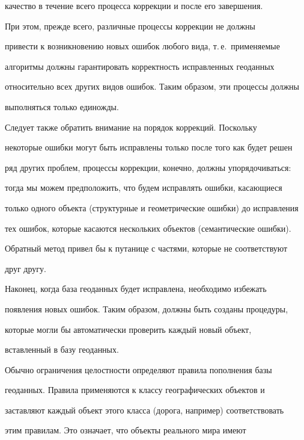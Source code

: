 качество в течение всего процесса коррекции и после его завершения. 


    


    При этом, прежде всего, различные процессы коррекции не должны 


привести к возникновению новых ошибок любого вида, т.\,е.\ применяемые 


алгоритмы должны гарантировать корректность исправленных геоданных 


относительно всех других видов ошибок. Таким образом, эти процессы должны 


выполняться только единожды. 


    


    Следует также обратить внимание на порядок коррекций. Поскольку 


некоторые ошибки могут быть исправлены только после того как будет решен 


ряд других проблем, процессы коррекции, конечно, должны упорядочиваться: 


тогда мы можем предположить, что будем исправлять ошибки, касающиеся 


только одного объекта (структурные и геометрические ошибки) до исправления 


тех ошибок, которые касаются нескольких объектов (семантические ошибки). 


Обратный метод привел бы к путанице с частями, которые не соответствуют 


друг другу. 


    


    Наконец, когда база геоданных будет исправлена, необходимо избежать 


появления новых ошибок. Таким образом, должны быть созданы процедуры, 


которые могли бы автоматически проверить каждый новый объект, 


вставленный в базу геоданных. 


    


    Обычно ограничения целостности определяют правила пополнения базы 


геоданных. Правила применяются к классу географических объектов и 


заставляют каждый объект этого класса (дорога, например) соответствовать 


этим правилам. Это означает, что объекты реального мира имеют 


